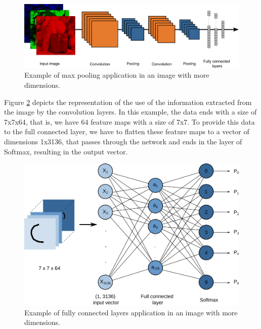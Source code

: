 \begin{figure}
    \centering
    \includegraphics[scale=0.22]{"Part 3 - Learning Systems/Supervised Learning/Deep Learning/images/figure123.png"}
    \caption{Example of max pooling application  in an image with more dimensions.}
    \label{fig:figure123}
\end{figure}

Figure \ref{fig:figure124} depicts the representation of the use of the information extracted from the image by the convolution layers. In this example, the data ends with a size of 7x7x64, that is, we have 64 feature maps with a size of 7x7. To provide this data to the full connected layer, we have to flatten these feature maps to a vector of dimensions 1x3136, that passes through the network and ends in the layer of Softmax, resulting in the output vector.

\begin{figure}
    \centering
    \includegraphics[scale=0.50]{"Part 3 - Learning Systems/Supervised Learning/Deep Learning/images/figure124.png"}
    \caption{Example of fully connected layers application in an image with more dimensions.}
    \label{fig:figure124}
\end{figure}

